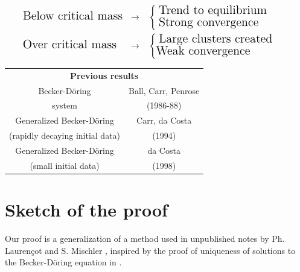 \documentclass{article}
\def\to{\rightarrow}
\begin{document}
\begin{multicols}{2}
\noindent
\begin{center}
  \noindent
  \colorbox{marronrp3}{
    \begin{minipage}[t]{.96\linewidth}
      \begin{align*}
        & \text{\Large Below critical mass}
        &\to \quad
        &\begin{cases}
          \text{ \Large Trend to equilibrium }\\
          \text{ \Large Strong convergence }
        \end{cases}
        &
        \\
        &\text{\Large Over critical mass }
        &\to \quad
        &\begin{cases}
          \text{ \Large Large clusters created}\\
          \text{\Large Weak convergence }
        \end{cases}
        &
      \end{align*}
    \end{minipage}
  }
\end{center}

\begin{center}  

\vspace{.5cm}

\Large
\begin{tabular}[t]{c|c}
  \multicolumn{2}{c}{\huge \textbf{Previous results}}
  \vspace{.3cm}
  \\
  Becker-Döring& Ball, Carr, Penrose\\
  system       & \cite{BCP86,BC88} (1986-88)\\
  \hline
  Generalized Becker-Döring &Carr, da Costa\\
  (rapidly decaying initial data) &\cite{CdC94} (1994)\\
  \hline
  Generalized Becker-Döring & da Costa \\
  (small initial data) & \cite{dC98} (1998)
\end{tabular}
\end{center}


  
\section*{Sketch of the proof}

Our proof is a generalization of a method used in unpublished notes by
Ph. Lauren\c{c}ot and S. Mischler \cite{LM}, inspired by the proof of
uniqueness of solutions to the Becker-D\"oring equation in
\cite{LM02e}.


\end{multicols}
\end{document}

